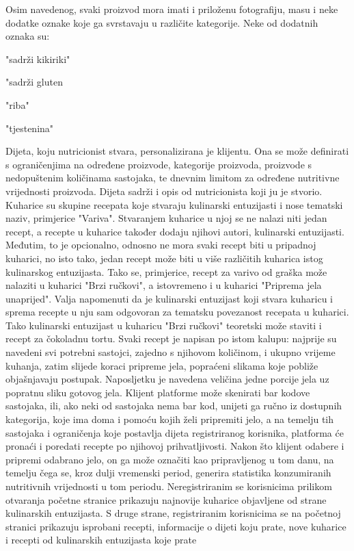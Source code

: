 	Osim navedenog, svaki proizvod mora imati i priloženu fotografiju, masu i neke dodatke oznake koje ga svrstavaju u različite kategorije. Neke od dodatnih oznaka su:
		\begin{packed_item}
			\item "sadrži kikiriki"
			\item "sadrži gluten
			\item "riba"
			\item "tjestenina"
		\end{packed_item}
	
	Dijeta, koju nutricionist stvara, personalizirana je klijentu. Ona se može definirati s ograničenjima na određene proizvode, kategorije proizvoda, proizvode s nedopuštenim količinama sastojaka, te dnevnim limitom za određene nutritivne vrijednosti proizvoda. Dijeta sadrži i opis od nutricionista koji ju je stvorio.
	Kuharice su skupine recepata koje stvaraju kulinarski entuzijasti i nose tematski naziv, primjerice "Variva". Stvaranjem kuharice u njoj se ne nalazi niti jedan recept, a recepte u kuharice također dodaju njihovi autori, kulinarski entuzijasti. Međutim, to je opcionalno, odnosno ne mora svaki recept biti u pripadnoj kuharici, no isto tako, jedan recept može biti u više različitih kuharica istog kulinarskog entuzijasta. Tako se, primjerice, recept za varivo od graška može nalaziti u kuharici "Brzi ručkovi", a istovremeno i u kuharici "Priprema jela unaprijed". Valja napomenuti da je kulinarski entuzijast koji stvara kuharicu i sprema recepte u nju sam odgovoran za tematsku povezanost recepata u kuharici. Tako kulinarski entuzijast u kuharicu "Brzi ručkovi" teoretski može staviti i recept za čokoladnu tortu.
	Svaki recept je napisan po istom kalupu: najprije su navedeni svi potrebni sastojci, zajedno s njihovom količinom, i ukupno vrijeme kuhanja, zatim slijede koraci pripreme jela, popraćeni slikama koje pobliže objašnjavaju postupak. Naposljetku je navedena veličina jedne porcije jela uz popratnu sliku gotovog jela.
	Klijent platforme može skenirati bar kodove sastojaka, ili, ako neki od sastojaka nema bar kod, unijeti ga ručno iz dostupnih kategorija, koje ima doma i pomoću kojih želi pripremiti jelo, a na temelju tih sastojaka i ograničenja koje postavlja dijeta registriranog korisnika, platforma će pronaći i poredati recepte po njihovoj prihvatljivosti. Nakon što klijent odabere i pripremi odabrano jelo, on ga može označiti kao pripravljenog u tom danu, na temelju čega se, kroz dulji vremenski period, generira statistika konzumiranih nutritivnih vrijednosti u tom periodu.
	Neregistriranim se korisnicima prilikom otvaranja početne stranice prikazuju najnovije kuharice objavljene od strane kulinarskih entuzijasta. S druge strane,  registriranim korisnicima se na početnoj stranici prikazuju isprobani recepti, informacije o dijeti koju prate, nove kuharice i recepti od kulinarskih entuzijasta koje prate
	
